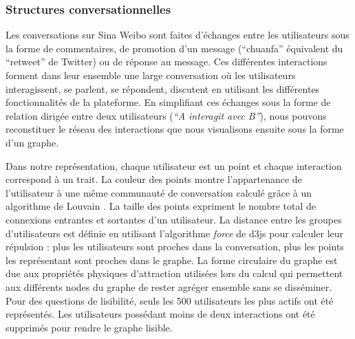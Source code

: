 \subsubsection[Structures conversationnelles]{Structures conversationnelles}
Les conversations sur Sina Weibo sont faites
d{\textquoteright}\'echanges entre les utilisateurs sous la forme de
commentaires, de promotion d{\textquoteright}un message
({\textquotedblleft}chuanfa{\textquotedblright} \'equivalent du
{\textquotedblleft}retweet{\textquotedblright} de Twitter) ou de
r\'eponse au message. Ces diff\'erentes interactions forment dans leur
ensemble une large conversation o\`u les utilisateurs interagissent, se
parlent, se r\'epondent, discutent en utilisant les diff\'erentes
fonctionnalit\'es de la plateforme. En simplifiant ces \'echanges sous
la forme de relation dirig\'ee entre deux utilisateurs
(\textit{{\textquotedblleft}A interagit avec B{\textquotedblright}}),
nous pouvons reconstituer le r\'eseau des interactions que nous
visualisons ensuite sous la forme d{\textquoteright}un graphe. 


Dans notre repr\'esentation, chaque utilisateur est un point et chaque
interaction correspond \`a un trait. La couleur des points montre
l{\textquoteright}appartenance de l{\textquoteright}utilisateur \`a une
m\^eme communaut\'e de conversation calcul\'e gr\^ace \`a un algorithme
de Louvain \citep{Blondel2008}. La taille des points expriment le
nombre total de connexions entrantes et sortantes d{\textquoteright}un
utilisateur. La distance entre les groupes
d{\textquoteright}utilisateurs est d\'efinie en utilisant
l{\textquoteright}algorithme \textit{force} de d3js \citep{Bostock2011} pour calculer leur r\'epulsion : plus les utilisateurs sont
proches dans la conversation, plus les points les repr\'esentant sont
proches dans le graphe. La forme circulaire du graphe est due aux
propri\'et\'es physiques d{\textquoteright}attraction utilis\'ees lors
du calcul qui permettent aux diff\'erents nodes du graphe de rester
agr\'eger ensemble sans se diss\'eminer. Pour des questions de
lisibilit\'e, seuls les 500 utilisateurs les plus actifs ont \'et\'e
repr\'esent\'es. Les utilisateurs poss\'edant moins de deux
interactions ont \'et\'e supprim\'es pour rendre le graphe lisible.

